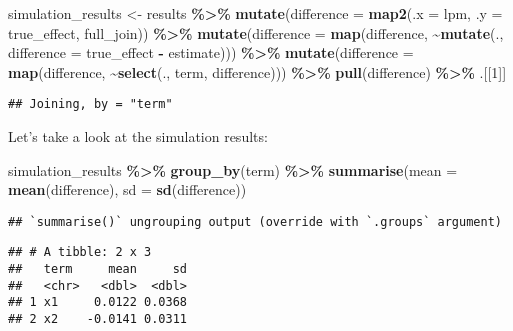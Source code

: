 \documentclass[
]{article}
\newenvironment{Shaded}{\begin{snugshade}}{\end{snugshade}}
\newcommand{\DataTypeTok}[1]{\textcolor[rgb]{0.13,0.29,0.53}{#1}}
\newcommand{\DecValTok}[1]{\textcolor[rgb]{0.00,0.00,0.81}{#1}}
\newcommand{\KeywordTok}[1]{\textcolor[rgb]{0.13,0.29,0.53}{\textbf{#1}}}
\newcommand{\NormalTok}[1]{#1}
\newcommand{\OperatorTok}[1]{\textcolor[rgb]{0.81,0.36,0.00}{\textbf{#1}}}
\newcommand{\StringTok}[1]{\textcolor[rgb]{0.31,0.60,0.02}{#1}}
\begin{document}
\begin{Shaded}
\begin{Highlighting}[]
\NormalTok{simulation\_results \textless{}{-}}\StringTok{ }\NormalTok{results }\OperatorTok{\%\textgreater{}\%}\StringTok{ }
\StringTok{  }\KeywordTok{mutate}\NormalTok{(}\DataTypeTok{difference =} \KeywordTok{map2}\NormalTok{(}\DataTypeTok{.x =}\NormalTok{ lpm, }\DataTypeTok{.y =}\NormalTok{ true\_effect, full\_join)) }\OperatorTok{\%\textgreater{}\%}\StringTok{  }
\StringTok{  }\KeywordTok{mutate}\NormalTok{(}\DataTypeTok{difference =} \KeywordTok{map}\NormalTok{(difference, }\OperatorTok{\textasciitilde{}}\KeywordTok{mutate}\NormalTok{(., }\DataTypeTok{difference =}\NormalTok{ true\_effect }\OperatorTok{{-}}\StringTok{ }\NormalTok{estimate))) }\OperatorTok{\%\textgreater{}\%}\StringTok{ }
\StringTok{  }\KeywordTok{mutate}\NormalTok{(}\DataTypeTok{difference =} \KeywordTok{map}\NormalTok{(difference, }\OperatorTok{\textasciitilde{}}\KeywordTok{select}\NormalTok{(., term, difference))) }\OperatorTok{\%\textgreater{}\%}\StringTok{ }
\StringTok{  }\KeywordTok{pull}\NormalTok{(difference) }\OperatorTok{\%\textgreater{}\%}\StringTok{ }
\StringTok{  }\NormalTok{.[[}\DecValTok{1}\NormalTok{]]}
\end{Highlighting}
\end{Shaded}

\begin{verbatim}
## Joining, by = "term"
\end{verbatim}

Let's take a look at the simulation results:

\begin{Shaded}
\begin{Highlighting}[]
\NormalTok{simulation\_results }\OperatorTok{\%\textgreater{}\%}\StringTok{ }
\StringTok{  }\KeywordTok{group\_by}\NormalTok{(term) }\OperatorTok{\%\textgreater{}\%}\StringTok{ }
\StringTok{  }\KeywordTok{summarise}\NormalTok{(}\DataTypeTok{mean =} \KeywordTok{mean}\NormalTok{(difference), }
            \DataTypeTok{sd =} \KeywordTok{sd}\NormalTok{(difference))}
\end{Highlighting}
\end{Shaded}

\begin{verbatim}
## `summarise()` ungrouping output (override with `.groups` argument)
\end{verbatim}

\begin{verbatim}
## # A tibble: 2 x 3
##   term     mean     sd
##   <chr>   <dbl>  <dbl>
## 1 x1     0.0122 0.0368
## 2 x2    -0.0141 0.0311
\end{verbatim}
\end{document}
